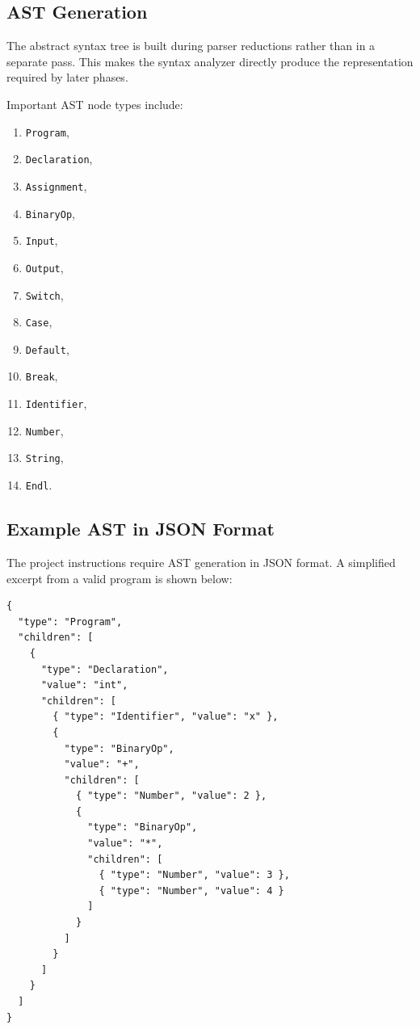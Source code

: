 \documentclass[12pt,a4paper]{article}
\begin{document}
\subsection{AST Generation}
The abstract syntax tree is built during parser reductions rather than in a separate pass. This makes the syntax analyzer directly produce the representation required by later phases.

Important AST node types include:

\begin{enumerate}
    \item \texttt{Program},
    \item \texttt{Declaration},
    \item \texttt{Assignment},
    \item \texttt{BinaryOp},
    \item \texttt{Input},
    \item \texttt{Output},
    \item \texttt{Switch},
    \item \texttt{Case},
    \item \texttt{Default},
    \item \texttt{Break},
    \item \texttt{Identifier},
    \item \texttt{Number},
    \item \texttt{String},
    \item \texttt{Endl}.
\end{enumerate}

\subsection{Example AST in JSON Format}
The project instructions require AST generation in JSON format. A simplified excerpt from a valid program is shown below:

\begin{lstlisting}
{
  "type": "Program",
  "children": [
    {
      "type": "Declaration",
      "value": "int",
      "children": [
        { "type": "Identifier", "value": "x" },
        {
          "type": "BinaryOp",
          "value": "+",
          "children": [
            { "type": "Number", "value": 2 },
            {
              "type": "BinaryOp",
              "value": "*",
              "children": [
                { "type": "Number", "value": 3 },
                { "type": "Number", "value": 4 }
              ]
            }
          ]
        }
      ]
    }
  ]
}
\end{lstlisting}
\end{document}
